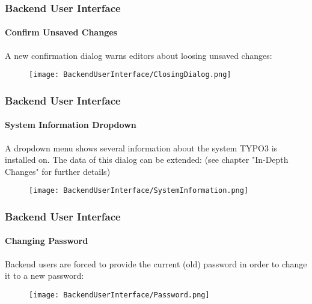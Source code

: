 \begin{frame}[fragile]
	\frametitle{Backend User Interface}
	\framesubtitle{Confirm Unsaved Changes}

	A new confirmation dialog warns editors about loosing unsaved changes:

	\begin{figure}
		\texttt{[image: BackendUserInterface/ClosingDialog.png]}
	\end{figure}

\end{frame}

\begin{frame}[fragile]
	\frametitle{Backend User Interface}
	\framesubtitle{System Information Dropdown}

	A dropdown menu shows several information about the system TYPO3 is installed on.
	The data of this dialog can be extended:\newline
	\small(see chapter "In-Depth Changes" for further details)\normalsize

	\begin{figure}
		\texttt{[image: BackendUserInterface/SystemInformation.png]}
	\end{figure}

\end{frame}

\begin{frame}[fragile]
	\frametitle{Backend User Interface}
	\framesubtitle{Changing Password}

	Backend users are forced to provide the current (old) password in order to change
	it to a new password:

	\begin{figure}
		\texttt{[image: BackendUserInterface/Password.png]}
	\end{figure}

\end{frame}

